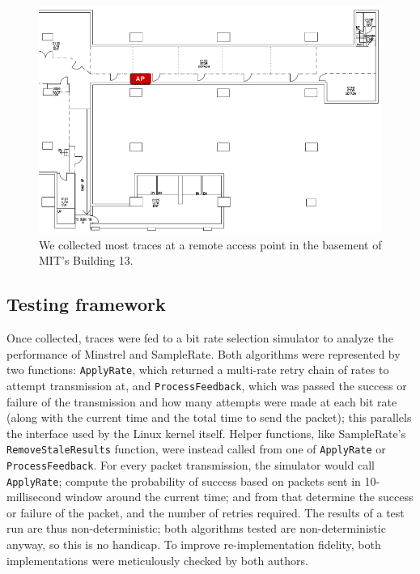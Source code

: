 \documentclass[twocolumn,10pt]{article}
\begin{document}
\begin{figure}[htbp]
  \centering
  \includegraphics[width=\linewidth]{bsmt13floorplan.png}
  \caption{We collected most traces at a remote access point in the
    basement of MIT's Building 13.}
\label{figure:1}
\end{figure}


\subsection{Testing framework}

Once collected, traces were fed to a bit rate selection simulator to
analyze the performance of Minstrel and SampleRate.  Both algorithms
were represented by two functions: \texttt{ApplyRate}, which returned
a multi-rate retry chain of rates to attempt transmission at, and
\texttt{ProcessFeedback}, which was passed the success or failure of
the transmission and how many attempts were made at each bit rate
(along with the current time and the total time to send the packet);
this parallels the interface used by the Linux kernel itself.  Helper
functions, like SampleRate's \texttt{RemoveStaleResults} function,
were instead called from one of \texttt{ApplyRate} or
\texttt{ProcessFeedback}.  For every packet transmission, the
simulator would call \texttt{ApplyRate}; compute the probability of
success based on packets sent in 10-millisecond window around the
current time; and from that determine the success or failure of the
packet, and the number of retries required.  The results of a test run
are thus non-deterministic; both algorithms tested are
non-deterministic anyway, so this is no handicap.  To improve
re-implementation fidelity, both implementations were meticulously
checked by both authors.
\end{document}
